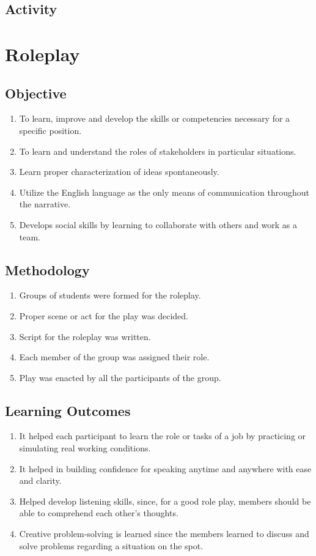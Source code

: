\subsection{Activity}

\pagebreak

\section{Roleplay}
\label{Roleplay}
\subsection{Objective}
\begin{enumerate}
    \item To learn, improve and develop the skills or competencies necessary for a specific
          position.
    \item To learn and understand the roles of stakeholders in particular situations.
    \item Learn proper characterization of ideas spontaneously.
    \item Utilize the English language as the only means of communication throughout the
          narrative.
    \item Develops social skills by learning to collaborate with others and work as a team.
\end{enumerate}

\subsection{Methodology}
\begin{enumerate}
    \item Groups of students were formed for the roleplay.
    \item Proper scene or act for the play was decided.
    \item Script for the roleplay was written.
    \item Each member of the group was assigned their role.
    \item Play was enacted by all the participants of the group.
\end{enumerate}

\subsection{Learning Outcomes}
\begin{enumerate}
    \item It helped each participant to learn the role or tasks of a job by practicing or simulating
          real working conditions.
    \item It helped in building confidence for speaking anytime and anywhere with ease and
          clarity.
    \item Helped develop listening skills, since, for a good role play, members should be able
          to comprehend each other's thoughts.
    \item Creative problem-solving is learned since the members learned to discuss and solve
          problems regarding a situation on the spot.
\end{enumerate}

